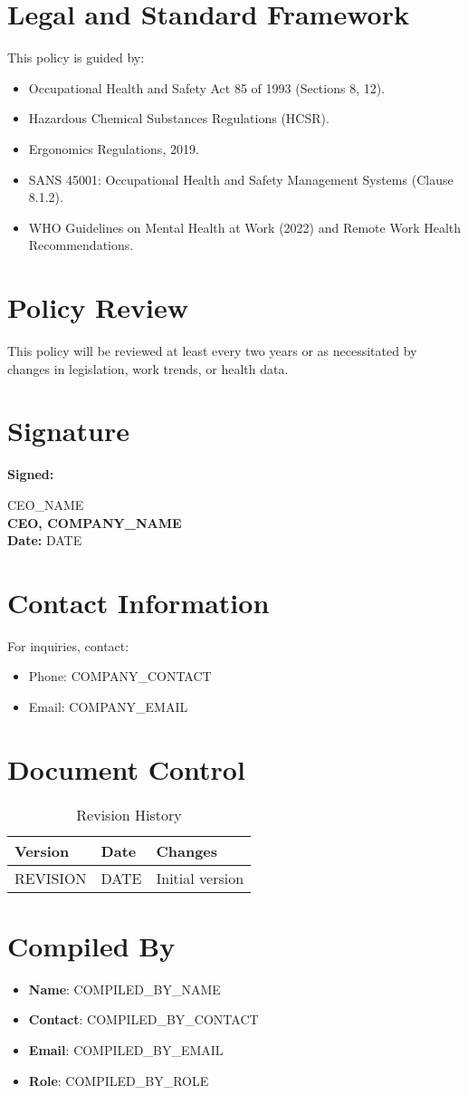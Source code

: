 \documentclass[12pt]{article}
\begin{document}
\section{Legal and Standard Framework}
This policy is guided by:
\begin{itemize}
    \item Occupational Health and Safety Act 85 of 1993 (Sections 8, 12).
    \item Hazardous Chemical Substances Regulations (HCSR).
    \item Ergonomics Regulations, 2019.
    \item SANS 45001: Occupational Health and Safety Management Systems (Clause 8.1.2).
    \item WHO Guidelines on Mental Health at Work (2022) and Remote Work Health Recommendations.
\end{itemize}

\section{Policy Review}
This policy will be reviewed at least every two years or as necessitated by changes in legislation, work trends, or health data.

\section{Signature}
\textbf{Signed:}

{{CEO_NAME}}\\
\textbf{CEO, {{COMPANY_NAME}}}\\
\textbf{Date:} {{DATE}}

\section{Contact Information}
For inquiries, contact:
\begin{itemize}
    \item Phone: {{COMPANY_CONTACT}}
    \item Email: {{COMPANY_EMAIL}}
\end{itemize}

\section{Document Control}
\begin{table}[h]
    \centering
    \begin{tabular}{p{3cm}p{3cm}p{6cm}}
        \toprule
        \textbf{Version} & \textbf{Date} & \textbf{Changes} \\
        \midrule
        {{REVISION}} & {{DATE}} & Initial version \\
        \bottomrule
    \end{tabular}
    \caption{Revision History}
\end{table}

\section{Compiled By}
\begin{itemize}
    \item \textbf{Name}: {{COMPILED_BY_NAME}}
    \item \textbf{Contact}: {{COMPILED_BY_CONTACT}}
    \item \textbf{Email}: {{COMPILED_BY_EMAIL}}
    \item \textbf{Role}: {{COMPILED_BY_ROLE}}
\end{itemize}
\end{document}
